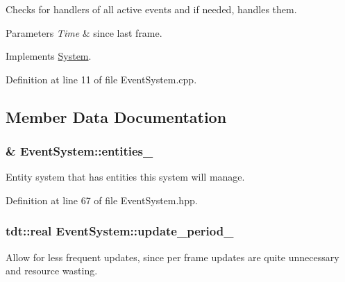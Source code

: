 Checks for handlers of all active events and if needed, handles them. 


\begin{DoxyParams}{Parameters}
{\em Time} & since last frame. \\
\hline
\end{DoxyParams}


Implements \hyperlink{class_system_a6d54c9bd38eb43d620a1451cb0925472}{System}.



Definition at line 11 of file Event\+System.\+cpp.



\subsection{Member Data Documentation}
\subsubsection[{\texorpdfstring{entities\+\_\+}{entities_}}]{\& Event\+System\+::entities\+\_\+\hspace{0.3cm}{\ttfamily [private]}}\hypertarget{class_event_system_ae68ff7a957934b312a0fa66f52d364c0}{}\label{class_event_system_ae68ff7a957934b312a0fa66f52d364c0}


Entity system that has entities this system will manage. 



Definition at line 67 of file Event\+System.\+hpp.

\subsubsection[{\texorpdfstring{update\+\_\+period\+\_\+}{update_period_}}]{\setlength{\rightskip}{0pt plus 5cm}tdt\+::real Event\+System\+::update\+\_\+period\+\_\+\hspace{0.3cm}{\ttfamily [private]}}\hypertarget{class_event_system_ae2c07675de523ca6157d766f83447d19}{}\label{class_event_system_ae2c07675de523ca6157d766f83447d19}


Allow for less frequent updates, since per frame updates are quite unnecessary and resource wasting. 



